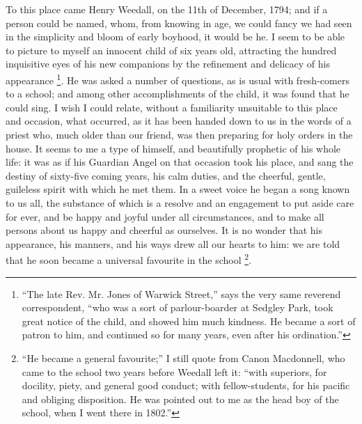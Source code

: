 To this place came Henry Weedall, on the 11th of
December, 1794; and if a person could be named, whom,
from knowing in age, we could fancy we had seen in the
simplicity and bloom of early boyhood, it would be he. I
seem to be able to picture to myself an innocent child of
six years old, attracting the hundred inquisitive eyes of
his new companions by the refinement and delicacy of his appearance \footnote{``The late Rev. Mr. Jones
of Warwick Street,'' says the very same reverend
correspondent, ``who was a sort of parlour-boarder at
Sedgley Park, took great notice of the child, and showed
him much kindness. He became a sort of patron to him, and
continued so for many years, even after his
ordination.''}. He was asked a number of questions, as is usual
with fresh-comers to a school; and among other
accomplishments of the child, it was found that he could
sing. I wish I could relate, without a familiarity
unsuitable to this place and occasion, what occurred, as
it has been handed down to us in the words of a priest
who, much older than our friend, was then preparing for
holy orders in the house. It seems to me a type of
himself, and beautifully prophetic of his whole life: it
was as if his Guardian Angel on that occasion took his
place, and sang the destiny of sixty-five coming years,
his calm duties, and the cheerful, gentle, guileless
spirit with which he met them. In a sweet voice he began
a song known to us all, the substance of which is a
resolve and an engagement to put aside care for ever, and
be happy and joyful under all circumstances, and to make
all persons about us happy and cheerful as ourselves. It
is no wonder that his appearance, his manners, and his
ways drew all our hearts to him: we are told that he soon
became a universal favourite in the school \footnote{``He became a general
favourite;'' I still quote from Canon Macdonnell, who
came to the school two years before Weedall left it:
``with superiors, for docility, piety, and general
good conduct; with fellow-students, for his pacific and
obliging disposition. He was pointed out to me as the
head boy of the school, when I went there in 1802.''}.

